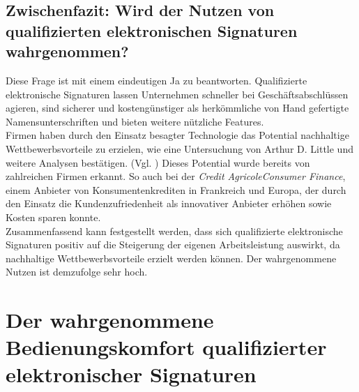 \documentclass[deutsch]{lib/llncs/llncs}
\begin{document}
\subsection{Zwischenfazit: Wird der Nutzen von qualifizierten elektronischen Signaturen wahrgenommen?}
Diese Frage ist mit einem eindeutigen Ja zu beantworten. Qualifizierte elektronische Signaturen lassen Unternehmen schneller bei Geschäftsabschlüssen agieren, sind sicherer und kostengünstiger als herkömmliche von Hand gefertigte Namensunterschriften und bieten weitere nützliche Features. \\
Firmen haben durch den Einsatz besagter Technologie das Potential nachhaltige Wettbewerbsvorteile zu erzielen, wie eine Untersuchung von Arthur D. Little und weitere Analysen bestätigen. (Vgl. \cite[S. 7]{arthurdlittle2015digitale})
Dieses Potential wurde bereits von zahlreichen Firmen erkannt. So auch bei der \textit{Credit AgricoleConsumer Finance}, einem Anbieter von Konsumentenkrediten in Frankreich und Europa, der durch den Einsatz die Kundenzufriedenheit als innovativer Anbieter erhöhen sowie Kosten sparen konnte. \cite[S. 13]{arthurdlittle2015digitale} \\
Zusammenfassend kann festgestellt werden, dass sich qualifizierte elektronische Signaturen positiv auf die Steigerung der eigenen Arbeitsleistung auswirkt, da nachhaltige Wettbewerbsvorteile erzielt werden können. Der wahrgenommene Nutzen ist demzufolge sehr hoch. 


\section{Der wahrgenommene Bedienungskomfort qualifizierter elektronischer Signaturen}
\end{document}
